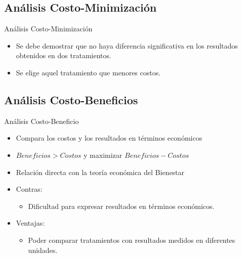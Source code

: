 \documentclass[xcolor=dvipsnames]{beamer}
\begin{document}
\subsection{Análisis Costo-Minimización}
    
    \begin{frame}{Análisis Costo-Minimización}
\begin{itemize}
    \item Se debe demostrar que no haya diferencia significativa en los resultados obtenidos en dos tratamientos.\\
   \item  Se elige aquel tratamiento que menores costos.
  
\end{itemize}
    
    \end{frame}

\subsection{Análisis Costo-Beneficios}

    \begin{frame}{Análisis Costo-Beneficio}
        
        \begin{itemize}
            \item Compara los costos y los resultados en términos económicos
            \item $Beneficios > Costos$ y maximizar $Beneficios - Costos$
            \item Relación directa con la teoría económica del Bienestar
            \item Contras:
            \begin{itemize}
                \item Dificultad para expresar resultados en términos económicos.
            \end{itemize}
            \item Ventajas:
            \begin{itemize}
                \item Poder comparar tratamientos con resultados medidos en diferentes unidades.
            \end{itemize}
            
        \end{itemize}
        
    \end{frame}
\end{document}
